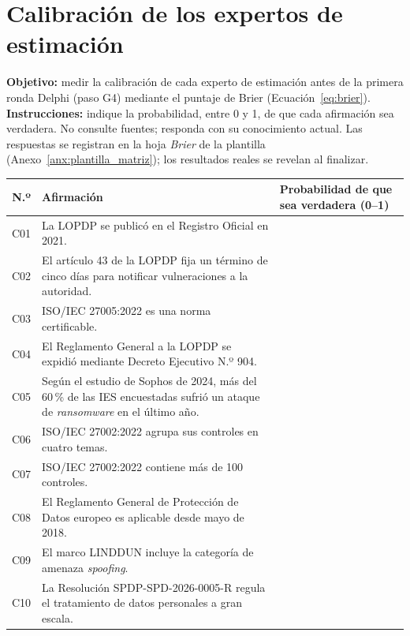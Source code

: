\section{Calibración de los expertos de estimación}
\label{sec:guia_calibracion}

\textbf{Objetivo:} medir la calibración de cada experto de estimación antes de la primera ronda Delphi (paso G4) mediante el puntaje de Brier (Ecuación~\ref{eq:brier}). \textbf{Instrucciones:} indique la probabilidad, entre 0 y 1, de que cada afirmación sea verdadera. No consulte fuentes; responda con su conocimiento actual. Las respuestas se registran en la hoja \textit{Brier} de la plantilla (Anexo~\ref{anx:plantilla_matriz}); los resultados reales se revelan al finalizar.

\begin{center}
\small
\renewcommand{\arraystretch}{1.3}
\begin{tabularx}{\textwidth}{|c|L|p{2.4cm}|}
  \hline
  \textbf{N.º} & \textbf{Afirmación} & \textbf{Probabilidad de que sea verdadera (0--1)} \\
  \hline
  C01 & La LOPDP se publicó en el Registro Oficial en 2021. & \\
  \hline
  C02 & El artículo 43 de la LOPDP fija un término de cinco días para notificar vulneraciones a la autoridad. & \\
  \hline
  C03 & ISO/IEC 27005:2022 es una norma certificable. & \\
  \hline
  C04 & El Reglamento General a la LOPDP se expidió mediante Decreto Ejecutivo N.º 904. & \\
  \hline
  C05 & Según el estudio de Sophos de 2024, más del 60\,\% de las IES encuestadas sufrió un ataque de \textit{ransomware} en el último año. & \\
  \hline
  C06 & ISO/IEC 27002:2022 agrupa sus controles en cuatro temas. & \\
  \hline
  C07 & ISO/IEC 27002:2022 contiene más de 100 controles. & \\
  \hline
  C08 & El Reglamento General de Protección de Datos europeo es aplicable desde mayo de 2018. & \\
  \hline
  C09 & El marco LINDDUN incluye la categoría de amenaza \textit{spoofing}. & \\
  \hline
  C10 & La Resolución SPDP-SPD-2026-0005-R regula el tratamiento de datos personales a gran escala. & \\
  \hline
\end{tabularx}
\end{center}

